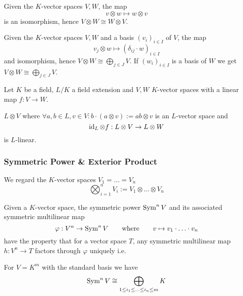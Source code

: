 \begin{example}
   Given the \(K\)-vector spaces \(V, W\), the map
   \[v \otimes w \mapsto w \otimes v\]
   is an isomorphism, hence \(V \otimes W \cong W \otimes V\).
\end{example}

\begin{example}
   Given the \(K\)-vector spaces \(V, W\) and a basis \((v_i)_{i \in I}\) of \(V\), the map
   \[v_j \otimes w \mapsto (\delta_{ij} \cdot w)_{i \in I}\]
   and isomorphism, hence \(V \otimes W \cong \bigoplus_{j \in J} V\).
   If \((w_i)_{i \in I}\) is a basis of \(W\) we get \(V \otimes W \cong \bigoplus_{j \in J} V\).
\end{example}

\begin{proposition}
   Let \(K\) be a field, \(L/K\) a field extension and \(V, W\) \(K\)-vector spaces with a linear map \(f: V \to W\).

   \(L \otimes V\) where \(\forall a, b \in L, v \in V: b \cdot (a \otimes v) := ab \otimes v\) is an \(L\)-vector space and
   \[\operatorname{id}_L \otimes f: L \otimes V \to L \otimes W\]
   is \(L\)-linear.
\end{proposition}

\subsubsection{Symmetric Power \& Exterior Product}
\begin{definition}
   We regard the \(K\)-vector spaces \(V_1 = \ldots = V_n\)
   \[\bigotimes_{i=1}^n V_i := V_1 \otimes \ldots \otimes V_n\]
\end{definition}

\begin{definition}
   Given a \(K\)-vector space, the symmetric power \(\operatorname{Sym}^nV\) and its associated symmetric multilinear map
   \[\varphi: V^n \to \operatorname{Sym}^nV \qquad\text{where}\qquad v \mapsto v_1 \cdot \ldots \cdot v_n\]
   have the property that for a vector space \(T\), any symmetric multilinear map \(h: V^n \to T\) factors through \(\varphi\) uniquely i.e.
   \begin{center}
   \end{center}
\end{definition}
\begin{remark}
   For \(V = K^m\) with the standard basis we have
   \[\operatorname{Sym}^nV \cong \bigoplus_{1 \leq i_1 \leq \ldots \leq i_n \leq m}K\]
\end{remark}

